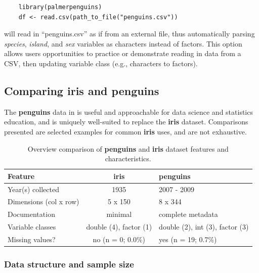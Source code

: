 \begin{verbatim}
    library(palmerpenguins)
    df <- read.csv(path_to_file("penguins.csv"))
\end{verbatim}

will read in ``penguins.csv'' as if from an external file, thus
automatically parsing \emph{species}, \emph{island}, and \emph{sex}
variables as characters instead of factors. This option allows users
opportunities to practice or demonstrate reading in data from a CSV,
then updating variable class (e.g., characters to factors).

\hypertarget{comparing-iris-and-penguins}{%
\subsection{\texorpdfstring{Comparing \textbf{iris} and
\textbf{penguins}}{Comparing iris and penguins}}\label{comparing-iris-and-penguins}}

The \textbf{penguins} data in  is useful and
approachable for data science and statistics education, and is uniquely
well-suited to replace the \textbf{iris} dataset. Comparisons presented
are selected examples for common \textbf{iris} uses, and are not
exhaustive.

\begin{Schunk}
\begin{table}

\caption{\label{tab:unnamed-chunk-2}Overview comparison of \textbf{penguins} and \textbf{iris} dataset features and characteristics.}
\centering
\begin{tabular}[t]{lcl}
\toprule
Feature & iris & penguins\\
\midrule
Year(s) collected & 1935 & 2007 - 2009\\
Dimensions (col x row) & 5 x 150 & 8 x 344\\
Documentation & minimal & complete metadata\\
Variable classes & double (4), factor (1) & double (2), int (3), factor (3)\\
Missing values? & no (n = 0; 0.0\%) & yes (n = 19; 0.7\%)\\
\bottomrule
\end{tabular}
\end{table}

\end{Schunk}

\hypertarget{data-structure-and-sample-size}{%
\subsubsection{Data structure and sample
size}\label{data-structure-and-sample-size}}

